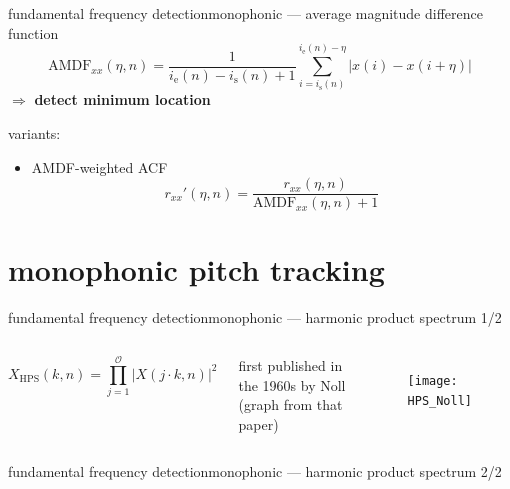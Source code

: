 	\begin{frame}{fundamental frequency detection}{monophonic --- average magnitude difference function}
		\begin{equation*}
			\mathrm{AMDF}_{xx}(\eta,n) = \frac{1}{i_{\mathrm{e}}(n)-i_{\mathrm{s}}(n)+1}\sum\limits_{i=i_{\mathrm{s}}(n)}^{i_{\mathrm{e}}(n)-\eta}{|x(i)- x(i+\eta)|} 
		\end{equation*}
		\pause
		$\Rightarrow$ \textbf{detect minimum location}
		
		\pause
		\vspace{3mm}
		variants:
		\begin{itemize}
			\item	AMDF-weighted ACF
				\begin{equation*}
					r_{xx}'(\eta,n) = \frac{r_{xx}(\eta,n)}{\mathrm{AMDF}_{xx}(\eta,n) + 1} 
				\end{equation*}
		\end{itemize}
	\end{frame}
	
    \section[frequency domain]{monophonic pitch tracking}
	\begin{frame}{fundamental frequency detection}{monophonic --- harmonic product spectrum 1/2}
        \vspace{-15mm}
        \begin{columns}
                \vspace{4mm}
                \begin{equation*}\label{eq:hps}
                    X_{\mathrm{HPS}}(k,n) = \prod\limits_{j=1}^{\mathcal{O}}{|X(j\cdot k,n)|^2}
                \end{equation*}
                
                first published in the 1960s by Noll (graph from that paper)
				\begin{figure}
                    \texttt{[image: HPS\_Noll]}
                \end{figure}
		\end{columns}
        \vspace{-5mm}
	\end{frame}
	
	\begin{frame}{fundamental frequency detection}{monophonic --- harmonic product spectrum 2/2}
	\end{frame}
	
